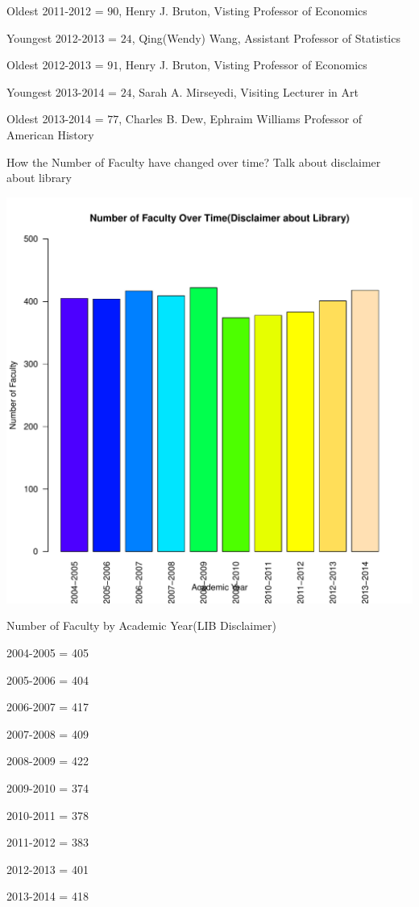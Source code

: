\documentclass[12pt,a4paper]{article}\usepackage[]{graphicx}\usepackage[]{color}
\makeatletter
\def\maxwidth{ %
  \ifdim\Gin@nat@width>\linewidth
    \linewidth
  \else
    \Gin@nat@width
  \fi
}
\newenvironment{knitrout}{}{} %
\theoremstyle{definition}
\makeatother
\begin{document}
\bigskip
Oldest 2011-2012 = \(90\), Henry J. Bruton, Visting Professor of Economics

\bigskip
Youngest 2012-2013 = \(24\), Qing(Wendy) Wang, Assistant Professor of Statistics

\bigskip
Oldest 2012-2013 = \(91\), Henry J. Bruton, Visting Professor of Economics

\bigskip
Youngest 2013-2014 = \(24\), Sarah A. Mirseyedi, Visiting Lecturer in Art

\bigskip
Oldest 2013-2014 = \(77\), Charles B. Dew, Ephraim Williams Professor of American History

\bigskip
How the Number of Faculty have changed over time? Talk about disclaimer about library



\begin{knitrout}
\color{fgcolor}
\includegraphics[width=\maxwidth]{figure/unnamed-chunk-8-1} 

\end{knitrout}

\begin{center}
Number of Faculty by Academic Year(LIB Disclaimer)

2004-2005 = 405

2005-2006 = 404

2006-2007 = 417

2007-2008 = 409

2008-2009 = 422

2009-2010 = 374

2010-2011 = 378

2011-2012 = 383

2012-2013 = 401

2013-2014 = 418
\end{center}
\end{document}
